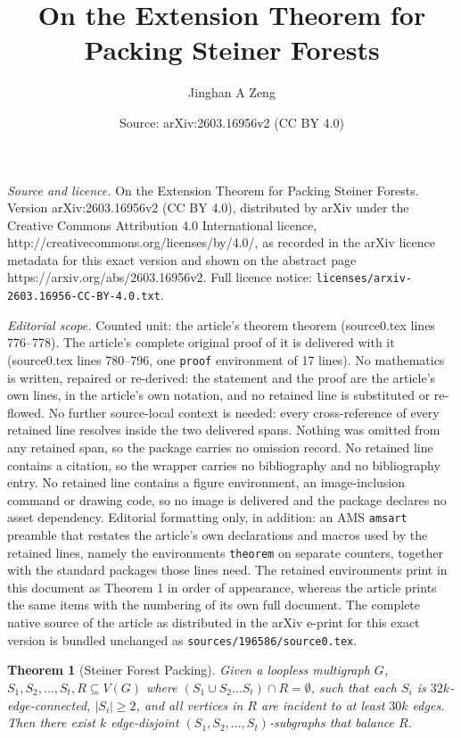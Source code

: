 \documentclass[10pt,a4paper]{amsart}
\title{On the Extension Theorem for Packing Steiner Forests}
\author{Jinghan A Zeng}
\date{Source: arXiv:2603.16956v2 (CC BY 4.0)}
\newtheorem{theorem}{Theorem}
\begin{document}
\maketitle

\noindent\emph{Source and licence.} On the Extension Theorem for Packing Steiner Forests. Version arXiv:2603.16956v2 (CC BY 4.0), distributed by arXiv under the Creative Commons Attribution 4.0 International licence, http://creativecommons.org/licenses/by/4.0/, as recorded in the arXiv licence metadata for this exact version and shown on the abstract page https://arxiv.org/abs/2603.16956v2. Full licence notice: \texttt{licenses/arxiv-2603.16956-CC-BY-4.0.txt}.\par\smallskip

\noindent\textit{Editorial scope.} Counted unit: the article's theorem theorem (source0.tex lines 776--778). The article's complete original proof of it is delivered with it (source0.tex lines 780--796, one \texttt{proof} environment of 17 lines). No mathematics is written, repaired or re-derived: the statement and the proof are the article's own lines, in the article's own notation, and no retained line is substituted or re-flowed.  No further source-local context is needed: every cross-reference of every retained line resolves inside the two delivered spans.  Nothing was omitted from any retained span, so the package carries no omission record.  No retained line contains a citation, so the wrapper carries no bibliography and no bibliography entry.  No retained line contains a figure environment, an image-inclusion command or drawing code, so no image is delivered and the package declares no asset dependency.  Editorial formatting only, in addition: an AMS \texttt{amsart} preamble that restates the article's own declarations and macros used by the retained lines, namely the environments \texttt{theorem} on separate counters, together with the standard packages those lines need.  The retained environments print in this document as Theorem 1 in order of appearance, whereas the article prints the same items with the numbering of its own full document.  The complete native source of the article as distributed in the arXiv e-print for this exact version is bundled unchanged as \texttt{sources/196586/source0.tex}.
\begin{theorem}[Steiner Forest Packing]
    Given a loopless multigraph $G$, $S_1,S_2,...,S_t, R \subseteq V(G)$ where $(S_1 \cup S_2...S_t) \cap R = \emptyset$, such that each $S_i$ is $32k$-edge-connected, $|S_i| \geq 2$, and all vertices in $R$ are incident to at least $30k$ edges. Then there exist $k$ edge-disjoint $(S_1,S_2,...,S_t)$-subgraphs that balance $R$. 
\end{theorem}
\end{document}
